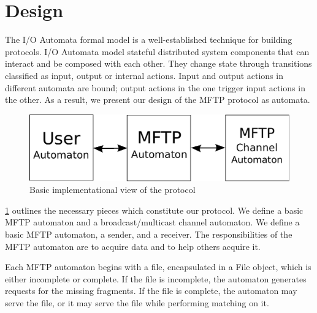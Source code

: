 \documentclass[letterpaper]{article}
\begin{document}
\section{Design}

The I/O Automata formal model is a well-established technique for building protocols.
I/O Automata model stateful distributed system components that can interact and be composed with each other.
They change state through transitions classified as input, output or internal actions.
Input and output actions in different automata are bound; output actions in the one trigger input actions in the other.
As a result, we present our design of the MFTP protocol as automata.

\begin{figure}
  \center
  \includegraphics[scale=0.65]{diagramOne}
  \caption{Basic implementational view of the protocol \label{DesignOne}}
\end{figure}

\ref{DesignOne} outlines the necessary pieces which constitute our protocol.
We define a basic MFTP automaton and a broadcast/multicast channel automaton.
We define a basic MFTP automaton, a sender, and a receiver.
The responsibilities of the MFTP automaton are to acquire data and to help others acquire it.

Each MFTP automaton begins with a file, encapsulated in a File object, which is either incomplete or complete.
If the file is incomplete, the automaton generates requests for the missing fragments.
If the file is complete, the automaton may serve the file, or it may serve the file while performing matching on it.
\end{document}
